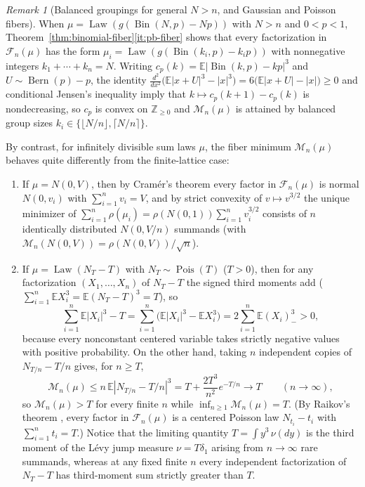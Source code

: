 \documentclass[11pt]{article}
\numberwithin{equation}{section}
\theoremstyle{definition}
\theoremstyle{remark}
\newtheorem{remark}[theorem]{Remark}
\DeclareMathOperator{\Bern}{Bern}
\DeclareMathOperator{\Bin}{Bin}
\DeclareMathOperator{\Pois}{Pois}
\DeclareMathOperator{\Law}{Law}
\newcommand{\E}{\mathbb E}
\newcommand{\Z}{\mathbb Z}
\begin{document}
\begin{remark}[Balanced groupings for general $N>n$, and Gaussian and Poisson fibers]\label{rem:balanced-and-id}
When $\mu=\Law(g(\Bin(N,p)-Np))$ with $N>n$ and $0<p<1$,
Theorem~\ref{thm:binomial-fiber}\ref{it:pb-fiber} shows that every
factorization in $\mathcal F_n(\mu)$ has the form
$\mu_i=\Law(g(\Bin(k_i,p)-k_ip))$ with nonnegative integers
$k_1+\cdots+k_n=N$. Writing $c_p(k)=\E|\Bin(k,p)-kp|^3$ and $U\sim\Bern(p)-p$,
the identity $\frac{d^2}{dx^2}\bigl(\E|x+U|^3-|x|^3\bigr)=6\bigl(\E|x+U|-|x|\bigr)\ge0$
and conditional Jensen's inequality imply that $k\mapsto c_p(k+1)-c_p(k)$ is
nondecreasing, so $c_p$ is convex on $\Z_{\ge0}$ and $\mathcal M_n(\mu)$ is
attained by balanced group sizes $k_i\in\{\lfloor N/n\rfloor,\lceil N/n\rceil\}$.

By contrast, for infinitely divisible sum laws $\mu$, the fiber minimum
$\mathcal M_n(\mu)$ behaves quite differently from the finite-lattice case:
\begin{enumerate}[label=(\arabic*),leftmargin=2em]
\item If $\mu=N(0,V)$, then by Cram\'er's theorem \citep{Cramer1936} every
factor in $\mathcal F_n(\mu)$ is normal $N(0,v_i)$ with $\sum_{i=1}^n v_i=V$,
and by strict convexity of $v\mapsto v^{3/2}$ the unique minimizer of
$\sum_{i=1}^n\rho(\mu_i)=\rho(N(0,1))\sum_{i=1}^n v_i^{3/2}$ consists of $n$
identically distributed $N(0,V/n)$ summands (with $\mathcal M_n(N(0,V))=\rho(N(0,V))/\sqrt n$).
\item If $\mu=\Law(N_T-T)$ with $N_T\sim\Pois(T)$ ($T>0$), then for any
factorization $(X_1,\ldots,X_n)$ of $N_T-T$ the signed third moments add
($\sum_{i=1}^n\E X_i^3=\E(N_T-T)^3=T$), so
\[
 \sum_{i=1}^n\E|X_i|^3-T
 =\sum_{i=1}^n\bigl(\E|X_i|^3-\E X_i^3\bigr)
 =2\sum_{i=1}^n\E(X_i)_-^3>0,
\]
because every nonconstant centered variable takes strictly negative values
with positive probability. On the other hand, taking $n$ independent copies
of $N_{T/n}-T/n$ gives, for $n\ge T$,
\[
 \mathcal M_n(\mu)\le n\,\E|N_{T/n}-T/n|^3
 =T+\frac{2T^3}{n^2}e^{-T/n}\longrightarrow T\qquad(n\to\infty),
\]
so $\mathcal M_n(\mu)>T$ for every finite $n$ while
$\inf_{n\ge1}\mathcal M_n(\mu)=T$. (By Raikov's theorem \citep{Raikov1938},
every factor in $\mathcal F_n(\mu)$ is a centered Poisson law
$N_{t_i}-t_i$ with $\sum_{i=1}^n t_i=T$.) Notice that the limiting quantity
$T=\int y^3\,\nu(dy)$ is the third moment of the L\'evy jump measure
$\nu=T\delta_1$ arising from $n\to\infty$ rare summands, whereas at any fixed
finite $n$ every independent factorization of $N_T-T$ has third-moment sum
strictly greater than $T$.
\end{enumerate}
\end{remark}
\end{document}
